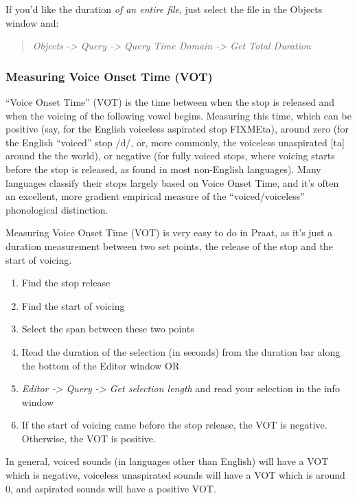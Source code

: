If you'd like the duration \emph{of an entire file}, just select the
file in the Objects window and:

\begin{quote}
\emph{Objects -\textgreater{} Query -\textgreater{} Query Time Domain
-\textgreater{} Get Total Duration}
\end{quote}

\hypertarget{measuring-voice-onset-time-vot}{%
\subsubsection{Measuring Voice Onset Time
(VOT)}\label{measuring-voice-onset-time-vot}}

``Voice Onset Time'' (VOT) is the time between when the stop is released
and when the voicing of the following vowel begins. Measuring this time,
which can be positive (say, for the English voiceless aspirated stop
FIXMEta), around zero (for the English ``voiced'' stop /d/, or, more
commonly, the voiceless unaspirated {[}ta{]} around the the world), or
negative (for fully voiced stops, where voicing starts before the stop
is released, as found in most non-English languages). Many languages
classify their stops largely based on Voice Onset Time, and it's often
an excellent, more gradient empirical measure of the
``voiced/voiceless'' phonological distinction.

Measuring Voice Onset Time (VOT) is very easy to do in Praat, as it's
just a duration measurement between two set points, the release of the
stop and the start of voicing.

\begin{enumerate}
\def\labelenumi{\arabic{enumi}.}
\tightlist
\item
  Find the stop release
\item
  Find the start of voicing
\item
  Select the span between these two points
\item
  Read the duration of the selection (in seconds) from the duration bar
  along the bottom of the Editor window OR
\item
  \emph{Editor -\textgreater{} Query -\textgreater{} Get selection
  length} and read your selection in the info window
\item
  If the start of voicing came before the stop release, the VOT is
  negative. Otherwise, the VOT is positive.
\end{enumerate}

In general, voiced sounds (in languages other than English) will have a
VOT which is negative, voiceless unaspirated sounds will have a VOT
which is around 0, and aspirated sounds will have a positive VOT.

